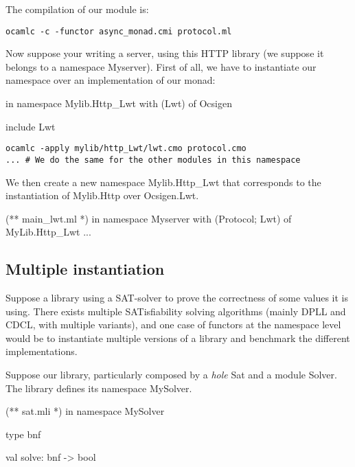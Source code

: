 The compilation of our module is:

\begin{verbatim}
ocamlc -c -functor async_monad.cmi protocol.ml
\end{verbatim}

\medskip

Now suppose your writing a server, using this HTTP library (we suppose it
belongs to a namespace Myserver). First of all, we have to instantiate our
namespace over an implementation of our monad:

\begin{OCaml}
in namespace Mylib.Http_Lwt
with (Lwt) of Ocsigen

include Lwt
\end{OCaml}

\begin{verbatim}
ocamlc -apply mylib/http_Lwt/lwt.cmo protocol.cmo
... # We do the same for the other modules in this namespace 
\end{verbatim}

We then create a new namespace Mylib.Http\_Lwt that corresponds to the
instantiation of Mylib.Http over Ocsigen.Lwt.

\begin{OCaml}
(** main_lwt.ml *)
in namespace Myserver
  with (Protocol; Lwt) of MyLib.Http_Lwt
...
\end{OCaml}

\subsection{Multiple instantiation}

Suppose a library using a SAT-solver to prove the correctness of some values it
is using. There exists multiple SATisfiability solving algorithms (mainly DPLL
and CDCL, with multiple variants), and one case of functors at the namespace
level would be to instantiate multiple versions of a library and benchmark the
different implementations.

Suppose our library, particularly composed by a \emph{hole} Sat and a module
Solver. The library defines its namespace MySolver.

\begin{OCaml}
(** sat.mli *)
in namespace MySolver

type bnf

val solve: bnf -> bool
\end{OCaml}

\medskip 

